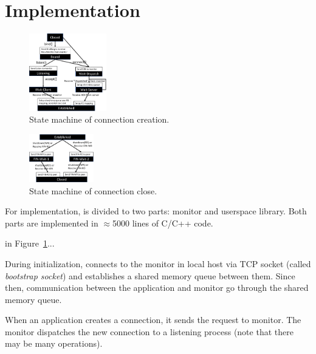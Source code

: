 \section{Implementation}
\label{sec:implementation}


\begin{figure}[htbp]
	\centering
	\includegraphics[width=0.3\textwidth]{images/conn-setup-new}
	\vspace{-5pt}
	\caption{State machine of connection creation.}
	\vspace{-10pt}
	\label{fig:conn-setup}
\end{figure}
\begin{figure}[htbp]
	\centering
	\includegraphics[width=0.25\textwidth]{images/conn-close-new}
	\vspace{-5pt}
	\caption{State machine of connection close.}
	\label{fig:conn-close}
	\vspace{-15pt}
\end{figure}

For implementation, \libipc is divided to two parts: monitor and userspace library. Both parts are implemented in $\approx$5000 lines of C/C++ code. %


in Figure~\ref{fig:conn-setup}...

During initialization, \libipc{} connects to the monitor in local host via TCP socket (called \emph{bootstrap socket}) and establishes a shared memory queue between them.
Since then, communication between the application and monitor go through the shared memory queue.

When an application creates a connection, it sends the request to monitor.
The monitor dispatches the new connection to a listening process (note that there may be many operations).

